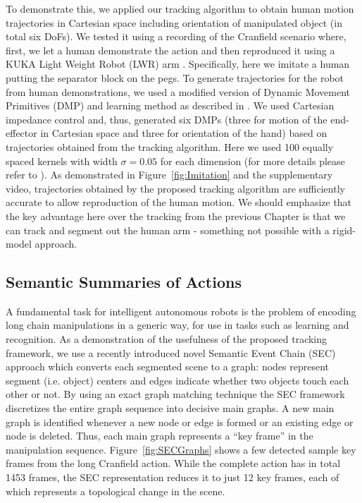 To demonstrate this, we applied our tracking algorithm to obtain human motion trajectories in Cartesian space including orientation of manipulated object (in total six DoFs). We tested it using a recording of the Cranfield scenario where, first, we let a human demonstrate the action and then reproduced it using a KUKA Light Weight Robot (LWR) arm \cite{kuka}. Specifically, here we imitate a human putting the separator block on the pegs. To generate trajectories for the robot from human demonstrations, we used a modified version of Dynamic Movement Primitives \cite{Ijspeert2002,Ijspeert2013} (DMP) and learning method as described in \cite{Kulvicius2012}. We used Cartesian impedance control and, thus, generated six DMPs (three for motion of the end-effector in Cartesian space and three for orientation of the hand) based on trajectories obtained from the tracking algorithm. Here we used 100 equally spaced kernels with width $\sigma=0.05$ for each dimension (for more details please refer to \cite{Kulvicius2012}).
 As demonstrated in Figure~\ref{fig:Imitation} and the supplementary video, trajectories obtained by the proposed tracking algorithm are sufficiently accurate to allow reproduction of the human motion. We should emphasize that the key advantage here over the tracking from the previous Chapter is that we can track and segment out the human arm - something not possible with a rigid-model approach.


\subsection{Semantic Summaries of Actions}
A fundamental task for intelligent autonomous robots is the problem of encoding long chain manipulations in a generic way, for use in tasks such as learning and recognition. As a demonstration of the usefulness of the proposed tracking framework, we use a recently introduced novel Semantic Event Chain (SEC) approach \cite{Aksoy11} which converts each segmented scene to a graph: nodes represent segment (i.e. object) centers and edges indicate whether two objects touch each other or not. By using an exact graph matching technique the SEC framework discretizes the entire graph sequence into decisive main graphs. A new main graph is identified whenever a new node or edge is formed or an existing edge or node is deleted. Thus, each main graph represents a “key frame” in the manipulation sequence. Figure~\ref{fig:SECGraphs} shows a few detected sample key frames from the long Cranfield action. While the complete action has in total 1453 frames, the SEC representation reduces it to just 12 key frames, each of which represents a topological change in the scene.

